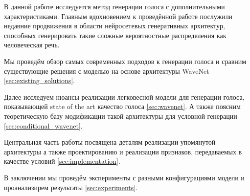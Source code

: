 \documentclass[../diploma.tex]{subfiles}
\begin{document}
        
    \label{sections/introduction}
    
    В данной работе исследуется метод генерации голоса с дополнительными характеристиками.
    Главным вдохновением к проведённой работе послужили недавние продвижения в области нейросетевых  генеративных архитектур, способных генерировать такие сложные вероятностные распределения как человеческая речь\cite{article:van2016wavenet}.
    
    Мы проведём обзор самых современных подходов к генерации голоса и сравним существующие решения с моделью на основе архитектуры WaveNet \ref{sec:existing_solutions}.
    
    Далее исследуем нюансы реализации легковесной модели для генерации голоса, показывающей state of the art качество голоса \ref{sec:wavenet}. А также поясним теоретическую базу модификации такой архитектуры для условной генерации \ref{sec:conditional_wavenet}. 
    
    Центральная часть работы посвящена деталям реализации упомянутой архитектуры а также проектированию и реализации признаков, передаваемых в качестве условий \ref{sec:implementation}.
    
    В заключении мы проведём эксперименты с разными конфигурациями модели и проанализирем результаты \ref{sec:experiments}.
\end{document}
